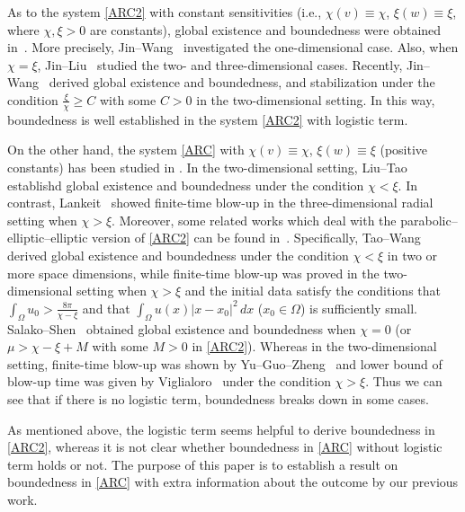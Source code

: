 \documentclass[12pt,reqno,draft]{article}
\numberwithin{equation}{section}
\theoremstyle{theorem}
\theoremstyle{definition}
\begin{document}
As to the system \eqref{ARC2} with constant sensitivities (i.e., 
$\chi(v) \equiv \chi$, $\xi(w) \equiv \xi$, where $\chi, \xi>0$ are constants), 
global existence and boundedness were obtained in~\cite{J-2015, JL-2015, JW-2015, JW-2020}. 
More precisely, Jin--Wang~\cite{JW-2015} investigated 
the one-dimensional case. 
Also, when $\chi=\xi$, Jin--Liu~\cite{JL-2015} studied 
the two- and three-dimensional cases. 
Recently, Jin--Wang~\cite{JW-2020} derived global existence and 
boundedness, and stabilization under the condition 
$\frac{\xi}{\chi} \ge C$ with some $C>0$ in the two-dimensional setting. 
In this way, boundedness is well established in the system \eqref{ARC2} 
with logistic term.

On the other hand, the system \eqref{ARC} with $\chi(v) \equiv \chi$, $\xi(w) \equiv \xi$ (positive constants) 
has been studied in \cite{L-pre, LT-2015}. 
In the two-dimensional setting, Liu--Tao~\cite{LT-2015} establishd 
global existence and boundedness 
under the condition $\chi<\xi$. 
In contrast, Lankeit~\cite{L-pre} showed finite-time blow-up 
in the three-dimensional radial setting
when $\chi>\xi$. 
Moreover, some related works which deal with
the parabolic--elliptic--elliptic version of \eqref{ARC2} 
can be found in~\cite{SS-2019, TW-2013, V-2019, YGZ-2017}. 
Specifically, Tao--Wang~\cite{TW-2013} derived 
global existence and boundedness under the condition $\chi<\xi$ in two or more space 
dimensions, 
while finite-time blow-up was proved in the two-dimensional setting 
when $\chi>\xi$ and the initial data satisfy 
the conditions that $\int_\Omega u_0>\frac{8\pi}{\chi-\xi}$ and that 
$\int_\Omega u(x)|x-x_0|^2\,dx$ ($x_0 \in \Omega$) is sufficiently small. 
Salako--Shen~\cite{SS-2019} obtained 
global existence and boundedness when $\chi=0$ (or $\mu>\chi-\xi+M$ with some $M>0$ in \eqref{ARC2}). 
Whereas in the two-dimensional setting, 
finite-time blow-up was shown by Yu--Guo--Zheng~\cite{YGZ-2017} 
and lower bound of blow-up time was given by Viglialoro~\cite{V-2019} 
under the condition $\chi>\xi$.
Thus we can see that if there is no logistic term, 
boundedness breaks down in some cases.

\vspace{2mm}

As mentioned above, the logistic term seems helpful to derive  
boundedness in \eqref{ARC2}, 
whereas it is not clear whether boundedness in \eqref{ARC} without logistic term holds or not. 
The purpose of this paper is to establish 
a result on boundedness in  \eqref{ARC} with extra information about the outcome by %
our previous work.
\vspace{2mm}
\end{document}

